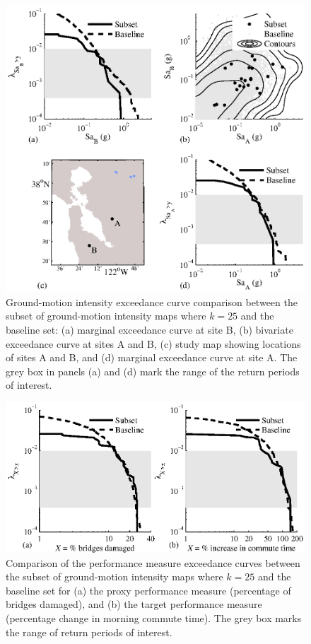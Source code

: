 \begin{figure}[t!]
\centering
\includegraphics[width=5.6in]{../FIGS/subsets_distributions.eps} %
\caption[]{Ground-motion intensity exceedance curve comparison between the subset of ground-motion intensity maps where $k=25$ and the baseline set: (a) marginal exceedance curve at site B, (b) bivariate exceedance curve at sites A and B, (c) study map showing locations of sites A and B, and (d) marginal exceedance curve at site A. The grey box in panels (a) and (d) mark the range of the return periods of interest. }
\label{fig:distributions}
\end{figure}



\begin{figure}[t!]
\centering
\includegraphics[width=5.6in]{../FIGS/subsets_pm.eps} %
\caption{Comparison of the performance measure exceedance curves between the subset of ground-motion intensity maps where $k=25$ and the baseline set for (a) the proxy performance measure (percentage of bridges damaged), and (b) the target performance measure (percentage change in morning commute time). The grey box marks the range of return periods of interest.}
\label{fig:pm}
\end{figure}


